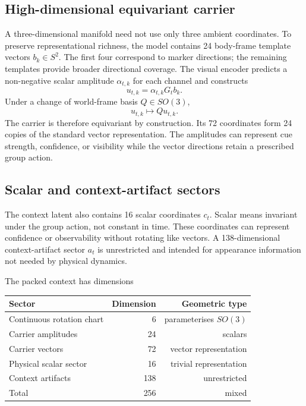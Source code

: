 \documentclass[11pt,a4paper]{article}
\begin{document}
\subsection{High-dimensional equivariant carrier}
A three-dimensional manifold need not use only three ambient coordinates. To preserve representational richness, the model contains 24 body-frame template vectors $b_k\in S^2$. The first four correspond to marker directions; the remaining templates provide broader directional coverage. The visual encoder predicts a non-negative scalar amplitude $\alpha_{t,k}$ for each channel and constructs
\begin{equation}
u_{t,k}=\alpha_{t,k}G_tb_k.
\end{equation}
Under a change of world-frame basis $Q\in SO(3)$,
\begin{equation}
u_{t,k}\mapsto Qu_{t,k}.
\end{equation}
The carrier is therefore equivariant by construction. Its 72 coordinates form 24 copies of the standard vector representation. The amplitudes can represent cue strength, confidence, or visibility while the vector directions retain a prescribed group action.

\subsection{Scalar and context-artifact sectors}
The context latent also contains 16 scalar coordinates $c_t$. Scalar means invariant under the group action, not constant in time. These coordinates can represent confidence or observability without rotating like vectors. A 138-dimensional context-artifact sector $a_t$ is unrestricted and intended for appearance information not needed by physical dynamics.

The packed context has dimensions
\begin{center}\begin{tabular}{lrr}\toprule
Sector & Dimension & Geometric type\\\midrule
Continuous rotation chart & 6 & parameterises $SO(3)$\\
Carrier amplitudes & 24 & scalars\\
Carrier vectors & 72 & vector representation\\
Physical scalar sector & 16 & trivial representation\\
Context artifacts & 138 & unrestricted\\\midrule
Total & 256 & mixed\\\bottomrule
\end{tabular}\end{center}
\end{document}
